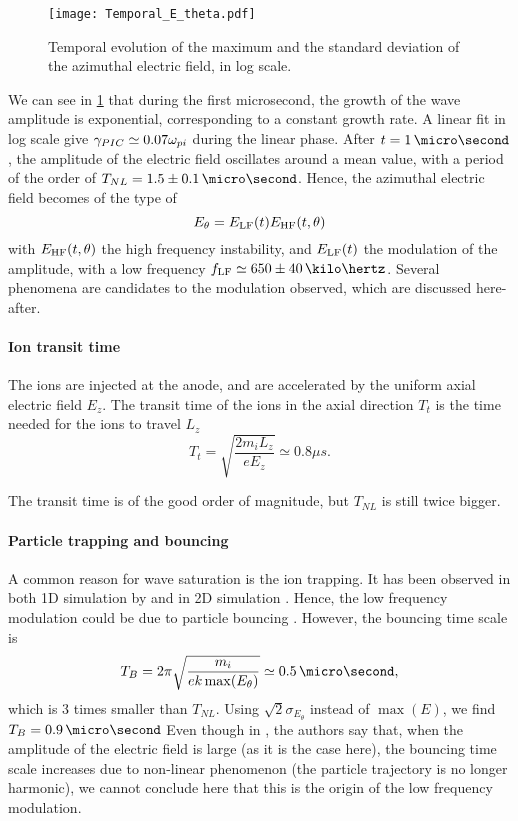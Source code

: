   \begin{figure}[!hbt]
    \centering
    \texttt{[image: Temporal\_E\_theta.pdf]}
    \caption{Temporal evolution of the maximum and the standard deviation of the azimuthal electric field, in log scale.}
    \label{fig-Ezstd_time}
  \end{figure}
  
  We can see in \cref{fig-Ezstd_time} that during the first microsecond, the growth of the wave amplitude is exponential, corresponding to a constant growth rate.
  A linear fit in log scale give $\gamma_{PIC} \simeq 0.07 \omega_{pi}$ during the linear phase.
  After $t=1\,\micro\second$, the amplitude of the electric field oscillates around a mean value, with a period of the order of $T_{NL}=1.5 \pm 0.1 \,\micro\second$.
  Hence, the azimuthal electric field becomes of the type of
  \[  E_{\theta} = E_{\rm LF}(t) E_{\rm HF}(t, {\theta}) \]
  with $E_{\rm HF}(t, \theta) $ the high frequency instability, and $E_{\rm LF}(t)$ the modulation of the amplitude, with a low frequency $f_{\rm LF} \simeq  650 \pm 40 \,\kilo\hertz$.
  Several phenomena are candidates to the modulation observed, which are discussed here-after.
  
  
  \paragraph{Ion transit time\\}
    The ions are injected at the anode, and are accelerated by the uniform axial electric field $E_z$.
    The transit time of the ions in the axial direction $T_t$  is the time needed for the ions to travel $L_z$
    \begin{equation} \label{eq-transittime}
      T_{t} = \sqrt{\frac{2 m_i L_z}{e E_z}} \simeq 0.8 \mu s.
    \end{equation}
    
    The transit time is of the good  order of magnitude, but $T_{NL}$ is still twice bigger.
    
  \paragraph{Particle trapping and bouncing\\}
    A common reason for wave saturation is the ion trapping. 
    It has been observed in both \ac{1D} simulation by \citet{lafleur2016a} and in \ac{2D} simulation \citep{croes2017a}.
    Hence, the low frequency modulation could be due to particle bouncing \citep{belmont2013}.
    However, the bouncing time scale is 
    \begin{equation} \label{eq-TB}
      T_{B} = 2 \pi \sqrt{\frac{m_i}{e k \max(E_{\theta})} } \simeq 0.5 \,\micro\second,
    \end{equation}
    which is 3 times smaller than $T_{NL}$.
    Using $\sqrt{2} \sigma_{E_{\theta}}$ instead of $\max(E)$, we find $T_B = 0.9\,\micro\second$
    Even though in \citet{belmont2013}, the authors say that, when the amplitude of the electric field is large (as it is the case here), the bouncing time scale increases due to non-linear phenomenon (the particle trajectory is no longer harmonic), we cannot conclude here that this is the origin of the low frequency modulation.

